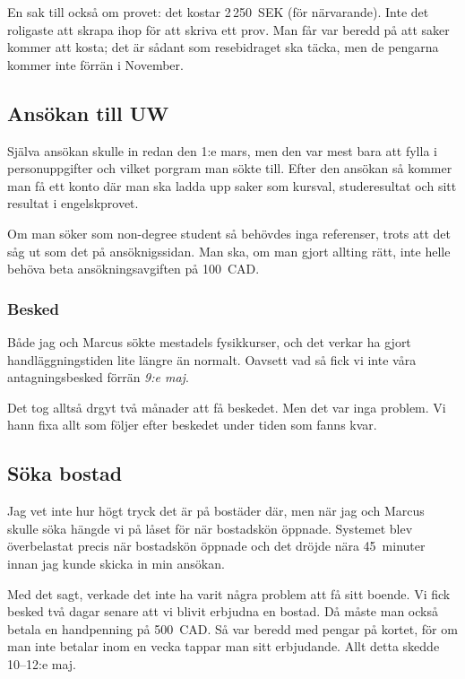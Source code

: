 \documentclass[11pt,a4paper, english, swedish]{article}
\begin{document}
En sak till också om provet: det kostar 2\,250~SEK (för
närvarande). Inte det roligaste att skrapa ihop för att skriva ett
prov. Man får var beredd på att saker kommer att kosta; det är sådant
som resebidraget ska täcka, men de pengarna kommer inte förrän i
November.

\subsection{Ansökan till UW}
Själva ansökan skulle in redan den 1:e mars, men den var mest bara att
fylla i personuppgifter och vilket porgram man sökte till. Efter den
ansökan så kommer man få ett konto\footnotemark{} där man ska ladda
upp saker som kursval, studeresultat och sitt resultat i
engelskprovet. 


Om man söker som non-degree student så behövdes inga referenser, trots
att det såg ut som det på ansöknigssidan. Man ska, om man gjort
allting rätt, inte helle behöva beta ansökningsavgiften på 100~CAD.

\subsubsection{Besked}
Både jag och Marcus sökte mestadels fysikkurser, och det verkar ha
gjort handläggningstiden lite längre än normalt. Oavsett vad så fick
vi inte våra antagningsbesked förrän \emph{9:e maj}. 

Det tog alltså drgyt två månader att få beskedet. Men det var inga
problem. Vi hann fixa allt som följer efter beskedet under tiden som
fanns kvar. 

\subsection{Söka bostad}
Jag vet inte hur högt tryck det är på bostäder där, men när jag och
Marcus skulle söka hängde vi på låset för när bostadskön
öppnade. Systemet blev överbelastat precis när bostadskön öppnade och
det dröjde nära 45~minuter innan jag kunde skicka in min ansökan.

Med det sagt, verkade det inte ha varit några problem att få sitt
boende. Vi fick besked två dagar senare att vi blivit erbjudna en
bostad. Då måste man också betala en 
handpenning på 500~CAD. Så var beredd
med pengar på kortet, för om man inte betalar inom en vecka tappar man
sitt erbjudande.
Allt detta skedde 10--12:e maj.
\end{document}
